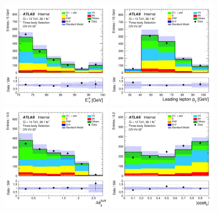 \begin{figure}[!htb]
    \begin{center}
        \includegraphics[width=0.48\textwidth]{figures/search_stop2l/bkg_est/crvsf/crvSF_MDR}
        \includegraphics[width=0.48\textwidth]{figures/search_stop2l/bkg_est/crvsf/crvSF_l_pt0}
        \includegraphics[width=0.48\textwidth]{figures/search_stop2l/bkg_est/crvsf/crvSF_DPB_vSS}
        \includegraphics[width=0.48\textwidth]{figures/search_stop2l/bkg_est/crvsf/crvSF_cosThetaB}

\end{center}
\end{figure}
